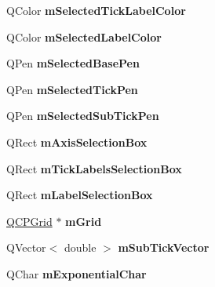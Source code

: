 \begin{DoxyCompactItemize}
\item 
\hypertarget{classQCPAxis_a3bcad40902f45dc4c991a2c3e4d31d70}{Q\-Color {\bfseries m\-Selected\-Tick\-Label\-Color}}\label{classQCPAxis_a3bcad40902f45dc4c991a2c3e4d31d70}

\item 
\hypertarget{classQCPAxis_a94f57de3ba024471ca206d83cf2258dd}{Q\-Color {\bfseries m\-Selected\-Label\-Color}}\label{classQCPAxis_a94f57de3ba024471ca206d83cf2258dd}

\item 
\hypertarget{classQCPAxis_a80baa4e3c16f9b6edf3eccacd2a50fde}{Q\-Pen {\bfseries m\-Selected\-Base\-Pen}}\label{classQCPAxis_a80baa4e3c16f9b6edf3eccacd2a50fde}

\item 
\hypertarget{classQCPAxis_a9524593dbc75a5c5b29dbd1cb4b37df5}{Q\-Pen {\bfseries m\-Selected\-Tick\-Pen}}\label{classQCPAxis_a9524593dbc75a5c5b29dbd1cb4b37df5}

\item 
\hypertarget{classQCPAxis_aa5cc6afc5dc2a365f5abbd36eb04a1dc}{Q\-Pen {\bfseries m\-Selected\-Sub\-Tick\-Pen}}\label{classQCPAxis_aa5cc6afc5dc2a365f5abbd36eb04a1dc}

\item 
\hypertarget{classQCPAxis_a6185814615059cacf09fdb74a3e539d7}{Q\-Rect {\bfseries m\-Axis\-Selection\-Box}}\label{classQCPAxis_a6185814615059cacf09fdb74a3e539d7}

\item 
\hypertarget{classQCPAxis_acca7a38191c1f4df06b9416d43172214}{Q\-Rect {\bfseries m\-Tick\-Labels\-Selection\-Box}}\label{classQCPAxis_acca7a38191c1f4df06b9416d43172214}

\item 
\hypertarget{classQCPAxis_a14fbf65daf2c38cbb0f2c4278a7929dd}{Q\-Rect {\bfseries m\-Label\-Selection\-Box}}\label{classQCPAxis_a14fbf65daf2c38cbb0f2c4278a7929dd}

\item 
\hypertarget{classQCPAxis_a17bffb94aaa40311f259c6ac7bcb5d5f}{\hyperlink{classQCPGrid}{Q\-C\-P\-Grid} $\ast$ {\bfseries m\-Grid}}\label{classQCPAxis_a17bffb94aaa40311f259c6ac7bcb5d5f}

\item 
\hypertarget{classQCPAxis_a28353081e0ff35c3fe5ced923a287faa}{Q\-Vector$<$ double $>$ {\bfseries m\-Sub\-Tick\-Vector}}\label{classQCPAxis_a28353081e0ff35c3fe5ced923a287faa}

\item 
\hypertarget{classQCPAxis_a0ec9dbb79704be01f780d34c6f57a08e}{Q\-Char {\bfseries m\-Exponential\-Char}}\label{classQCPAxis_a0ec9dbb79704be01f780d34c6f57a08e}


\end{DoxyCompactItemize}
